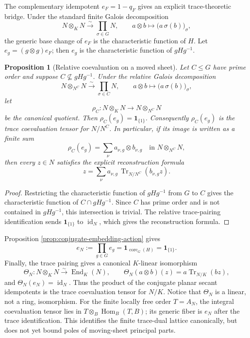 \documentclass[11pt]{article}
\newtheorem{proposition}[theorem]{Proposition}
\theoremstyle{remark}
\theoremstyle{definition}
\DeclareMathOperator{\core}{core}
\begin{document}
The complementary idempotent \(e_F=1-q_F\) gives an explicit
trace-theoretic bridge.  Under the standard finite Galois decomposition
\[
  N\otimes_KN\xrightarrow{\sim}\prod_{\sigma\in G}N,
  \qquad
  a\otimes b\longmapsto\bigl(a\,\sigma(b)\bigr)_{\sigma},
\]
the generic base change of \(e_F\) is the characteristic function of
\(H\).  Let \(e_g=(g\otimes g)e_F\); then \(e_g\) is the characteristic
function of \(gHg^{-1}\).

\begin{proposition}[Relative coevaluation on a moved sheet]
\label{prop:relative-coevaluation-moved-sheet}
Let \(C\leq G\) have prime order and suppose
\(C\nsubseteq gHg^{-1}\).  Under the relative Galois decomposition
\[
  N\otimes_{N^C}N\xrightarrow{\sim}\prod_{\sigma\in C}N,
  \qquad
  a\otimes b\longmapsto\bigl(a\,\sigma(b)\bigr)_{\sigma},
\]
let
\[
  \rho_C:N\otimes_KN\longrightarrow N\otimes_{N^C}N
\]
be the canonical quotient.  Then
\(\rho_C(e_g)=\mathbf1_{\{1\}}\).  Consequently \(\rho_C(e_g)\) is the
trace coevaluation tensor for \(N/N^C\).  In particular, if its image is
written as a finite sum
\[
  \rho_C(e_g)=\sum_\nu a_{\nu,g}\otimes b_{\nu,g}
  \quad\text{in }N\otimes_{N^C}N,
\]
then every \(z\in N\) satisfies the explicit reconstruction formula
\[
  z=\sum_\nu a_{\nu,g}\,
       \operatorname{Tr}_{N/N^C}(b_{\nu,g}z).
\]
\end{proposition}

\begin{proof}
Restricting the characteristic function of \(gHg^{-1}\) from \(G\) to
\(C\) gives the characteristic function of
\(C\cap gHg^{-1}\).  Since \(C\) has prime order and is not contained in
\(gHg^{-1}\), this intersection is trivial.  The relative trace-pairing
identification sends \(\mathbf1_{\{1\}}\) to \(\operatorname{id}_N\),
which gives the reconstruction formula.
\end{proof}

Proposition
\ref{prop:conjugate-embedding-action} gives
\[
  e_N:=\prod_{g\in G}e_g
  =\mathbf1_{\core_G(H)}
  =\mathbf1_{\{1\}}.
\]
Finally, the trace pairing gives a canonical \(K\)-linear isomorphism
\[
  \Theta_N:N\otimes_KN\xrightarrow{\sim}\operatorname{End}_K(N),
  \qquad
  \Theta_N(a\otimes b)(z)=a\operatorname{Tr}_{N/K}(bz),
\]
and \(\Theta_N(e_N)=\operatorname{id}_N\).  Thus the product of the
conjugate planar secant idempotents is the trace coevaluation tensor for
\(N/K\).  Notice that \(\Theta_N\) is a linear, not a ring, isomorphism.
For the finite locally free order \(T=A_N\), the integral coevaluation tensor
lies in \(T\otimes_B\operatorname{Hom}_B(T,B)\); its generic fiber is
\(e_N\) after the trace identification.  This identifies the finite
trace-dual lattice canonically, but does not yet bound poles of moving-sheet
principal parts.
\end{document}
